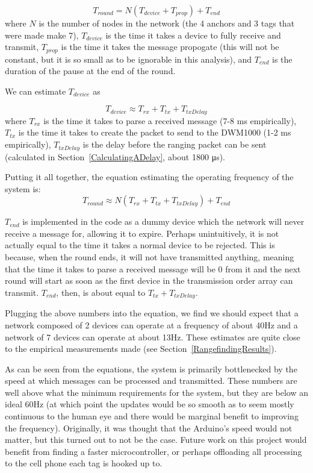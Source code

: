 \[
	T_{round} =  N(T_{device} + T_{prop}) + T_{end}
\]
where $N$ is the number of nodes in the network (the 4 anchors and 3 tags that were made make 7), $T_{device}$ is the time it takes a device to fully receive and transmit, $T_{prop}$ is the time it takes the message propogate (this will not be constant, but it is so small as to be ignorable in this analysis), and $T_{end}$ is the duration of the pause at the end of the round. 

We can estimate $T_{device}$ as

\[
	T_{device} \approx T_{rx} + T_{tx} + T_{txDelay}
\]
where $T_{rx}$ is the time it takes to parse a received message (7-8 ms empirically), $T_{tx}$ is the time it takes to create the packet to send to the DWM1000 (1-2 ms empirically), $T_{txDelay}$ is the delay before the ranging packet can be sent (calculated in Section~\ref{CalculatingADelay}, about 1800 \si{\micro\second}).

Putting it all together, the equation estimating the operating frequency of the system is:
\[
	T_{round} \approx N(T_{rx} + T_{tx} + T_{txDelay}) + T_{end}
\]

$T_{end}$ is implemented in the code as a dummy device which the network will never receive a message for, allowing it to expire. Perhaps unintuitively, it is not actually equal to the time it takes a normal device to be rejected. This is because, when the round ends, it will not have transmitted anything, meaning that the time it takes to parse a received message will be 0 from it and the next round will start as soon as the first device in the transmission order array can transmit. $T_{end}$, then, is about equal to $T_{tx} + T_{txDelay}$.

Plugging the above numbers into the equation, we find we should expect that a network composed of 2 devices can operate at a frequency of about 40Hz and a network of 7 devices can operate at about 13Hz. These estimates are quite close to the empirical measurements made (see Section~\ref{RangefindingResults}).

As can be seen from the equations, the system is primarily bottlenecked by the speed at which messages can be processed and transmitted. These numbers are well above what the minimum requirements for the system, but they are below an ideal 60Hz (at which point the updates would be so smooth as to seem mostly continuous to the human eye and there would be marginal benefit to improving the frequency). Originally, it was thought that the Arduino's speed would not matter, but this turned out to not be the case. Future work on this project would benefit from finding a faster microcontroller, or perhaps offloading all processing to the cell phone each tag is hooked up to. 

